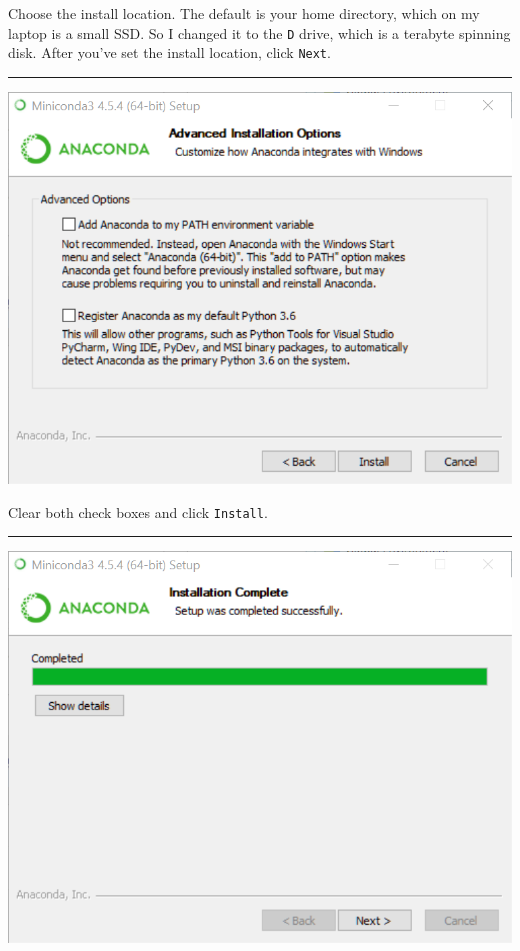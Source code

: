 \documentclass[]{book}
\theoremstyle{definition}
\theoremstyle{definition}
\theoremstyle{definition}
\theoremstyle{remark}
\begin{document}
Choose the install location. The default is your home directory, which
on my laptop is a small SSD. So I changed it to the \texttt{D} drive,
which is a terabyte spinning disk. After you've set the install
location, click \texttt{Next}.

\begin{center}\rule{0.5\linewidth}{\linethickness}\end{center}

\begin{center}\includegraphics[width=0.9\linewidth]{screenshots/2018-08-31_16_18_47-Miniconda3_4.5.4_(64-bit)_Setup} \end{center}

Clear both check boxes and click \texttt{Install}.

\begin{center}\rule{0.5\linewidth}{\linethickness}\end{center}

\begin{center}\includegraphics[width=0.9\linewidth]{screenshots/2018-08-31_16_21_12-Miniconda3_4.5.4_(64-bit)_Setup} \end{center}
\end{document}

